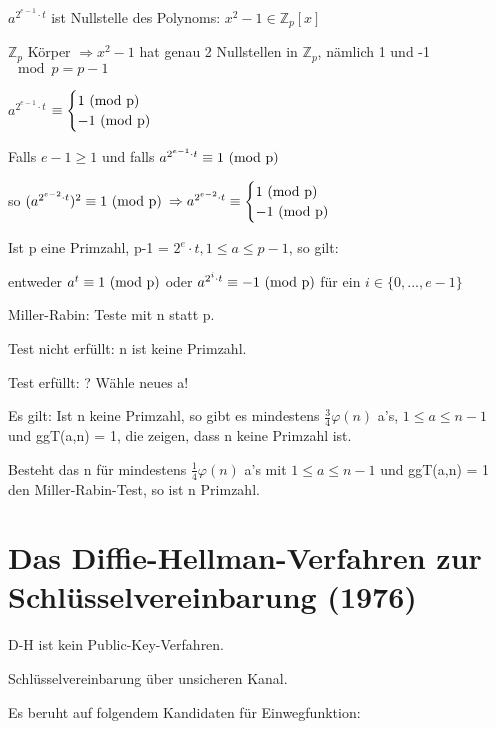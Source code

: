   $a^{2^{e-1} \cdot t}$ ist Nullstelle des Polynoms: $x^2 -1 \in \mathbb{Z}_p[x]$

  $\mathbb{Z}_p$ Körper $\Rightarrow x^2 -1$ hat genau 2 Nullstellen in $\mathbb{Z}_p$, nämlich 1 und -1 $\mod p = p-1$

  $a^{2^{e-1} \cdot t}$ $\equiv \begin{cases}1 \textnormal{ (mod p)} \\ -1 \textnormal{ (mod p)}\end{cases}$

  Falls $e-1 \ge 1$ und falls $a^{2^{e-1} \cdot t} \equiv 1 \textnormal{ (mod p)}$ 

  so $(a^{2^{e-2} \cdot t})^2 \equiv 1 \textnormal{ (mod p)}$ $\Rightarrow a^{2^{e-2} \cdot t} \equiv \begin{cases} 1 \textnormal{ (mod p)} \\ -1 \textnormal{ (mod p)} \end{cases}$

  Ist p eine Primzahl, p-1 = $2^e \cdot t, 1 \le a \le p-1$, so gilt:

  entweder $a^t \equiv 1 \textnormal{ (mod p)}$ oder $a^{2^i \cdot t} \equiv -1 \textnormal{ (mod p)}$ für ein $i \in \{0,...,e-1\}$

  Miller-Rabin: Teste mit n statt p.

  Test nicht erfüllt: n ist keine Primzahl.

  Test erfüllt: ? Wähle neues a!

  Es gilt: Ist n keine Primzahl, so gibt es mindestens $\frac{3}{4} \varphi(n)$ a's, $1 \le a \le n-1$ und ggT(a,n) = 1, die zeigen, dass n keine Primzahl ist.

  Besteht das n für mindestens $\frac{1}{4} \varphi(n)$ a's mit $1 \le a \le n-1$ und ggT(a,n) = 1 den Miller-Rabin-Test, so ist n Primzahl.

  \section{Das Diffie-Hellman-Verfahren zur Schlüsselvereinbarung (1976)}

  D-H ist kein Public-Key-Verfahren.

  Schlüsselvereinbarung über unsicheren Kanal.

  Es beruht auf folgendem Kandidaten für Einwegfunktion:

